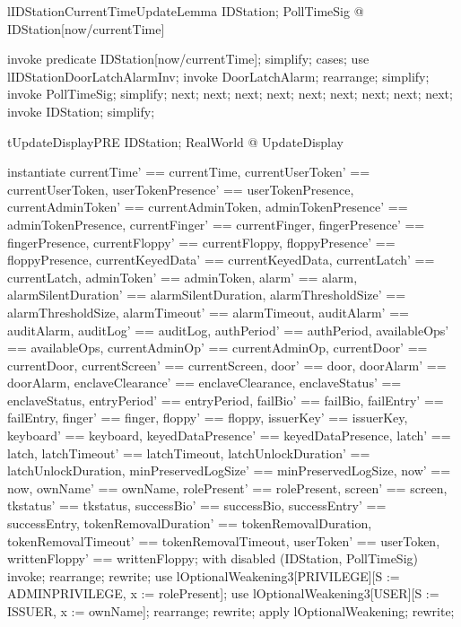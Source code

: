 \begin{theorem}{lIDStationCurrentTimeUpdateLemma}
\forall  IDStation; PollTimeSig @ IDStation[now/currentTime]
\end{theorem}

\begin{zproof}[lIDStationCurrentTimeUpdateLemma]
invoke predicate IDStation[now/currentTime];
simplify;
cases;
use lIDStationDoorLatchAlarmInv;
invoke DoorLatchAlarm;
rearrange;
simplify;
invoke PollTimeSig;
simplify;
next;
next;
next;
next;
next;
next;
next;
next;
next;
invoke IDStation;
simplify;
\end{zproof}

\begin{theorem}{tUpdateDisplayPRE}
\forall  IDStation; RealWorld @ \pre  UpdateDisplay
\end{theorem}

\begin{zproof}[tUpdateDisplayPRE]
instantiate
  currentTime' == currentTime, currentUserToken' == currentUserToken,
  userTokenPresence' == userTokenPresence,
  currentAdminToken' == currentAdminToken,
  adminTokenPresence' == adminTokenPresence, currentFinger' == currentFinger,
  fingerPresence' == fingerPresence, currentFloppy' == currentFloppy,
  floppyPresence' == floppyPresence, currentKeyedData' == currentKeyedData,
  currentLatch' == currentLatch, adminToken' == adminToken, alarm' == alarm,
  alarmSilentDuration' == alarmSilentDuration,
  alarmThresholdSize' == alarmThresholdSize, alarmTimeout' == alarmTimeout,
  auditAlarm' == auditAlarm, auditLog' == auditLog, authPeriod' == authPeriod,
  availableOps' == availableOps, currentAdminOp' == currentAdminOp,
  currentDoor' == currentDoor, currentScreen' == currentScreen, door' == door,
  doorAlarm' == doorAlarm, enclaveClearance' == enclaveClearance,
  enclaveStatus' == enclaveStatus, entryPeriod' == entryPeriod,
  failBio' == failBio, failEntry' == failEntry, finger' == finger,
  floppy' == floppy, issuerKey' == issuerKey, keyboard' == keyboard,
  keyedDataPresence' == keyedDataPresence, latch' == latch,
  latchTimeout' == latchTimeout, latchUnlockDuration' == latchUnlockDuration,
  minPreservedLogSize' == minPreservedLogSize, now' == now,
  ownName' == ownName, rolePresent' == rolePresent, screen' == screen,
  tkstatus' == tkstatus, successBio' == successBio, successEntry' == successEntry,
  tokenRemovalDuration' == tokenRemovalDuration,
  tokenRemovalTimeout' == tokenRemovalTimeout, userToken' == userToken,
  writtenFloppy' == writtenFloppy;
with disabled (IDStation, PollTimeSig) invoke;
rearrange;
rewrite;
use lOptionalWeakening3[PRIVILEGE][S := ADMINPRIVILEGE, x := rolePresent];
use lOptionalWeakening3[USER][S := ISSUER, x := ownName];
rearrange;
rewrite;
apply lOptionalWeakening;
rewrite;
\end{zproof}

